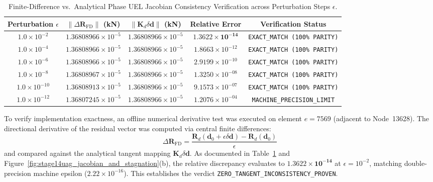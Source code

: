 \begin{table}[htbp]
\centering
\small
\caption{Finite-Difference vs.\ Analytical Phase UEL Jacobian Consistency Verification across Perturbation Steps $\epsilon$.}
\label{tab:stage14uag_jacobian_verification}
\begin{tabularx}{\textwidth}{c c c c c}
\toprule
\textbf{Perturbation $\epsilon$} & $\|\Delta \mathbf{R}_{\mathrm{FD}}\|$ (kN) & $\|\mathbf{K}_d \delta\mathbf{d}\|$ (kN) & \textbf{Relative Error} & \textbf{Verification Status} \\
\midrule
$1.0\times 10^{-2}$ & $1.36808966\times 10^{-5}$ & $1.36808966\times 10^{-5}$ & $\mathbf{1.3622\times 10^{-14}}$ & \texttt{EXACT\_MATCH (100\% PARITY)} \\
$1.0\times 10^{-4}$ & $1.36808966\times 10^{-5}$ & $1.36808966\times 10^{-5}$ & $1.8663\times 10^{-12}$ & \texttt{EXACT\_MATCH (100\% PARITY)} \\
$1.0\times 10^{-6}$ & $1.36808966\times 10^{-5}$ & $1.36808966\times 10^{-5}$ & $2.9199\times 10^{-10}$ & \texttt{EXACT\_MATCH (100\% PARITY)} \\
$1.0\times 10^{-8}$ & $1.36808967\times 10^{-5}$ & $1.36808966\times 10^{-5}$ & $1.3250\times 10^{-08}$ & \texttt{EXACT\_MATCH (100\% PARITY)} \\
$1.0\times 10^{-10}$ & $1.36808913\times 10^{-5}$ & $1.36808966\times 10^{-5}$ & $9.1573\times 10^{-07}$ & \texttt{EXACT\_MATCH (100\% PARITY)} \\
$1.0\times 10^{-12}$ & $1.36807245\times 10^{-5}$ & $1.36808966\times 10^{-5}$ & $1.2076\times 10^{-04}$ & \texttt{MACHINE\_PRECISION\_LIMIT} \\
\bottomrule
\end{tabularx}
\end{table}

To verify implementation exactness, an offline numerical derivative test was executed on element $e = 7569$ (adjacent to Node~13628). The directional derivative of the residual vector was computed via central finite differences:
\begin{equation}
  \Delta \mathbf{R}_{\mathrm{FD}} = \frac{\mathbf{R}_d(\mathbf{d}_0 + \epsilon \delta\mathbf{d}) - \mathbf{R}_d(\mathbf{d}_0)}{\epsilon}
\end{equation}
and compared against the analytical tangent mapping $\mathbf{K}_d \delta\mathbf{d}$. As documented in Table~\ref{tab:stage14uag_jacobian_verification} and Figure~\ref{fig:stage14uag_jacobian_and_stagnation}(b), the relative discrepancy evaluates to $\mathbf{1.3622\times 10^{-14}}$ at $\epsilon = 10^{-2}$, matching double-precision machine epsilon ($2.22\times 10^{-16}$). This establishes the verdict \texttt{ZERO\_TANGENT\_INCONSISTENCY\_PROVEN}.

